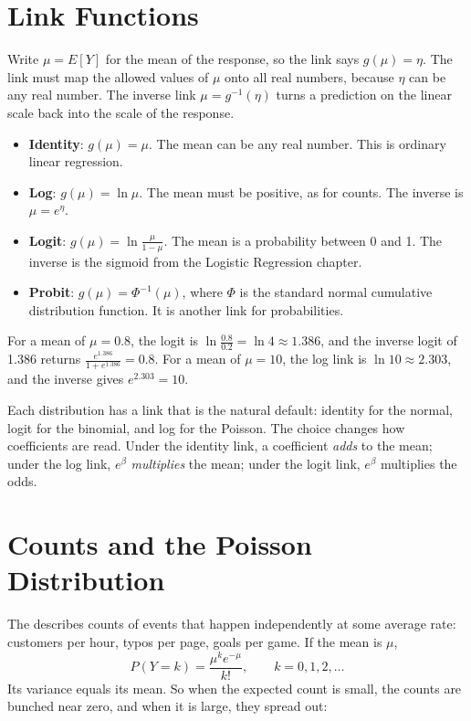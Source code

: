 \section{Link Functions}
Write $\mu = E[Y]$ for the mean of the response, so the link says $g(\mu) = \eta$. The link must map the allowed
values of $\mu$ onto all real numbers, because $\eta$ can be any real number. The inverse link
$\mu = g^{-1}(\eta)$ turns a prediction on the linear scale back into the scale of the response.

\begin{itemize}
\item \textbf{Identity}: $g(\mu) = \mu$. The mean can be any real number. This is ordinary linear regression.
\item \textbf{Log}: $g(\mu) = \ln \mu$. The mean must be positive, as for counts. The inverse is $\mu = e^{\eta}$.
\item \textbf{Logit}: $g(\mu) = \ln\frac{\mu}{1 - \mu}$. The mean is a probability between 0 and 1. The inverse is the
sigmoid from the Logistic Regression chapter.
\item \textbf{Probit}: $g(\mu) = \Phi^{-1}(\mu)$, where $\Phi$ is the standard normal cumulative distribution function.
It is another link for probabilities.
\end{itemize}

For a mean of $\mu = 0.8$, the logit is $\ln\frac{0.8}{0.2} = \ln 4 \approx 1.386$, and the inverse logit of 1.386
returns $\frac{e^{1.386}}{1 + e^{1.386}} = 0.8$. For a mean of $\mu = 10$, the log link is $\ln 10 \approx 2.303$, and
the inverse gives $e^{2.303} = 10$.

Each distribution has a  link that is the natural default: identity for the normal, logit for
the binomial, and log for the Poisson. The choice changes how coefficients are read. Under the identity link, a
coefficient \emph{adds} to the mean; under the log link, $e^{\beta}$ \emph{multiplies} the mean; under the logit
link, $e^{\beta}$ multiplies the odds.

\section{Counts and the Poisson Distribution}
The  describes counts of events that happen independently at some average rate:
customers per hour, typos per page, goals per game. If the mean is $\mu$,
$$P(Y = k) = \frac{\mu^k e^{-\mu}}{k!}, \qquad k = 0, 1, 2, \ldots$$
Its variance equals its mean. So when the expected count is small, the counts are bunched near zero, and when it
is large, they spread out:

